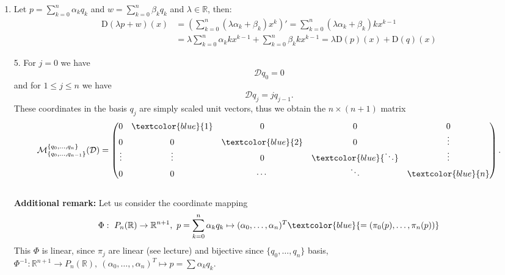 {\begin{enumerate}
\begin{enumerate}
		Asssume $\exists\alpha_0,\dots,\alpha_n~(m:=\text{max}\{k:\alpha_k\neq 0\})$ not all zero with $\sum_{k=0}^{m}\alpha_kq_k=0$
		\begin{align*}&\Rightarrow~~\sum_{k=0}^{m}\alpha_kq_k=\sum_{k=0}^{m-1}\alpha_kq_k+\alpha_mq_m=0\\
		&\Rightarrow~~\sum_{k=0}^{m}\alpha_kx^k=(-\alpha_m)x^m\\
		&\textcolor{red}{\text{contradiction to 2.}}
		\end{align*}
		\item 
		\begin{align*}
		&\text{span}\{q_0,\dots,q_n\}=P_n(\mathbb{R})~~\text{by definition}\\
		\Rightarrow~~&\text{dim}(P_n(\mathbb{R}))=n+1
		\end{align*}
	\end{enumerate}
	\item 
	Let $p=\sum_{k=0}^{n}\alpha_kq_k$ and $w =\sum_{k=0}^{n}\beta_kq_k$ and $\lambda\in\mathbb{R}$, then:
	\begin{align*}\text{D}(\lambda p+w)(x)&=\left(\sum_{k=0}^{n}(\lambda \alpha_k+\beta_k)x^k\right)'=\sum_{k=0}^{n}(\lambda \alpha_k+\beta_k)kx^{k-1}\\&=\lambda\sum_{k=0}^{n}\alpha_kkx^{k-1}+\sum_{k=0}^{n}\beta_kkx^{k-1}=\lambda \text{D}(p)(x)+\text{D}(q)(x)\end{align*}
	\item[5.] 
	For $j=0$ we have
	$$\mathcal{D}q_0 = 0 $$
	and for $1\leq j \leq n$ we have
	$$\mathcal{D}q_j = j q_{j-1}.$$
	These coordinates in the basis $q_j$ are simply scaled unit vectors, thus we obtain the $n\times (n+1)$ matrix
	$$\mathcal{M}^{\{q_0,\ldots,q_n\}}_{\{q_0,\ldots,q_{n-1}\}}(\mathcal{D})
	=
	 \begin{pmatrix}
	0&\textcolor{blue}{1}&0&0&0\\
	0&0&\textcolor{blue}{2}&0&\vdots\\
	\vdots&\vdots&0&\textcolor{blue}{\ddots}&\vdots\\
	0&0&\cdots&\ddots&\textcolor{blue}{n}
	\end{pmatrix}.$$
 	~\\
	\textbf{Additional remark:}
	Let us consider the coordinate mapping
	$$
	\Phi:~P_n(\mathbb{R})\rightarrow\mathbb{R}^{n+1},~p=\sum_{k=0}^{n}\alpha_kq_k\mapsto  (\alpha_0,\dots,\alpha_n)^T \textcolor{blue}{=(\pi_0(p),\dots,\pi_n(p))}
	$$
	This $\Phi$ is linear, since $\pi_j$ are linear (see lecture) and bijective since $\{q_0,\dots,q_n\}$ basis, $\Phi^{-1}:\mathbb{R}^{n+1}\rightarrow P_n(\mathbb{R}),~(\alpha_0,\dots,,\alpha_n)^T\mapsto p=\sum \alpha_kq_k$.\

\end{enumerate}}
